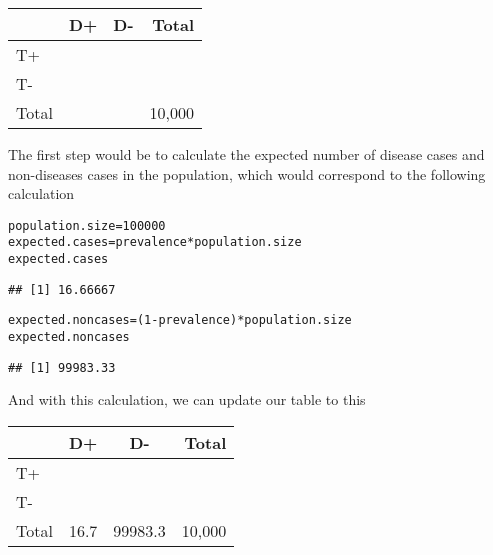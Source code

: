 \documentclass[11pt]{article}\usepackage[]{graphicx}\usepackage[]{color}
\makeatletter
\newcommand{\hlnum}[1]{\textcolor[rgb]{0.686,0.059,0.569}{#1}}%
\newcommand{\hlopt}[1]{\textcolor[rgb]{0,0,0}{#1}}%
\newcommand{\hlstd}[1]{\textcolor[rgb]{0.345,0.345,0.345}{#1}}%
\newcommand{\hlkwb}[1]{\textcolor[rgb]{0.69,0.353,0.396}{#1}}%
\newenvironment{kframe}{%
 \def\at@end@of@kframe{}%
 \ifinner\ifhmode%
  \def\at@end@of@kframe{\end{minipage}}%
  \begin{minipage}{\columnwidth}%
 \fi\fi%
 \def\FrameCommand##1{\hskip\@totalleftmargin \hskip-\fboxsep
 \colorbox{shadecolor}{##1}\hskip-\fboxsep
     \hskip-\linewidth \hskip-\@totalleftmargin \hskip\columnwidth}%
 \MakeFramed {\advance\hsize-\width
   \@totalleftmargin\z@ \linewidth\hsize
   \@setminipage}}%
 {\par\unskip\endMakeFramed%
 \at@end@of@kframe}
\newenvironment{knitrout}{}{} %
\makeatother
\begin{document}
\begin{center}
\begin{tabular}{|l|c|c|r|}
\hline 
& D+ & D- & Total\\ 
\hline
T+ & & & \\ 
\hline
T- & & & \\ 
\hline 
Total & & & 10,000 \\ 
\hline 
\end{tabular} 
\end{center} 

The first step would be to calculate the expected number of disease cases and non-diseases cases in the population, which would correspond to the following calculation
\begin{knitrout}
\color{fgcolor}\begin{kframe}
\begin{alltt}
\hlstd{population.size} \hlkwb{=} \hlnum{100000}
\hlstd{expected.cases} \hlkwb{=} \hlstd{prevalence} \hlopt{*} \hlstd{population.size}
\hlstd{expected.cases}
\end{alltt}
\begin{verbatim}
## [1] 16.66667
\end{verbatim}
\begin{alltt}
\hlstd{expected.noncases} \hlkwb{=} \hlstd{(}\hlnum{1} \hlopt{-} \hlstd{prevalence)} \hlopt{*} \hlstd{population.size}
\hlstd{expected.noncases}
\end{alltt}
\begin{verbatim}
## [1] 99983.33
\end{verbatim}
\end{kframe}
\end{knitrout}

And with this calculation, we can update our table to this
\begin{center}
\begin{tabular}{|l|c|c|r|}
\hline 
& D+ & D- & Total\\ 
\hline
T+ & & & \\ 
\hline
T- & & & \\ 
\hline 
Total & 16.7 & 99983.3 & 10,000 \\ 
\hline 
\end{tabular} 
\end{center}
\end{document}
